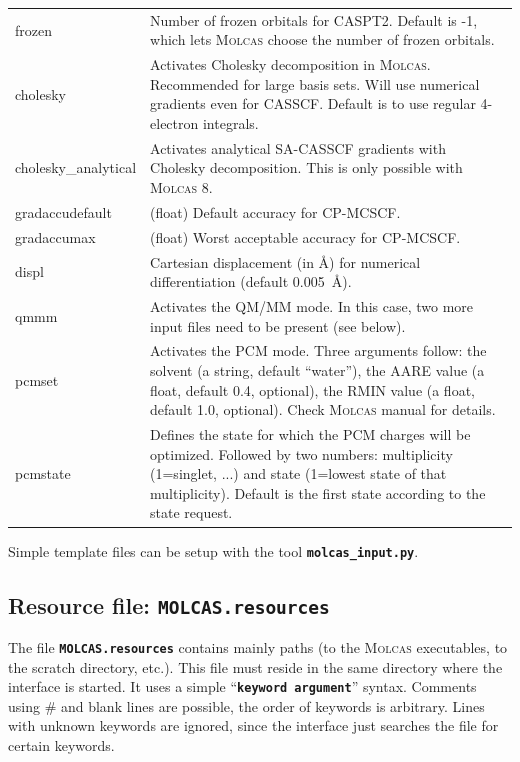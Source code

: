 \documentclass[a4paper,10pt,DIV=15,openany]{scrbook}
\newcommand{\ttt}[1]{\textbf{\texttt{#1}}}
\begin{document}
\begin{table}
\begin{tabular}{>{\ttfamily}lp{12cm}}
frozen          &Number of frozen orbitals for CASPT2. Default is -1, which lets \textsc{Molcas} choose the number of frozen orbitals.\\
cholesky        &Activates Cholesky decomposition in \textsc{Molcas}. Recommended for large basis sets. Will use numerical gradients even for CASSCF. Default is to use regular 4-electron integrals.\\
cholesky\_analytical    &Activates analytical SA-CASSCF gradients with Cholesky decomposition. This is only possible with \textsc{Molcas} 8.\\
gradaccudefault &(float) Default accuracy for CP-MCSCF.\\
gradaccumax     &(float) Worst acceptable accuracy for CP-MCSCF.\\
displ           &Cartesian displacement (in \AA) for numerical differentiation (default 0.005~\AA).\\
qmmm            &Activates the QM/MM mode. In this case, two more input files need to be present (see below).\\
pcmset          &Activates the PCM mode. Three arguments follow: the solvent (a string, default ``water''), the AARE value (a float, default 0.4, optional), the RMIN value (a float, default 1.0, optional). Check \textsc{Molcas} manual for details.\\
pcmstate        &Defines the state for which the PCM charges will be optimized. Followed by two numbers: multiplicity (1=singlet, ...) and state (1=lowest state of that multiplicity). Default is the first state according to the state request.\\
  \hline
  \end{tabular}
\end{table}

Simple template files can be setup with the tool \ttt{molcas\_input.py}.


\subsection{Resource file: \ttt{MOLCAS.resources}}

The file \ttt{MOLCAS.resources} contains mainly paths (to the \textsc{Molcas} executables, to the scratch directory, etc.). This file must reside in the same directory where the interface is started. It uses a simple ``\ttt{keyword argument}'' syntax. Comments using \# and blank lines are possible, the order of keywords is arbitrary. Lines with unknown keywords are ignored, since the interface just searches the file for certain keywords.
\end{document}
